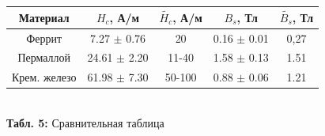 \documentclass[12pt,a4paper]{scrartcl}
\begin{document}
\begin{center}
	\begin{tabular}{|c|c|c|c|c|}
		\hline
		Материал     & $H_c$, А/м & $\tilde{H_c}$, А/м  & $B_s$, Тл & $\tilde{B_s}$, Тл \\ \hline
		Феррит       & 7.27 $\pm$ 0.76     & 20      & 0.16 $\pm$ 0.01    & 0,27               \\ \hline
		Пермаллой    & 24.61 $\pm$ 2.20      & 11-40    & 1.58 $\pm$ 0.13  & 1.51               \\ \hline
		Крем. железо & 61.98 $\pm$ 7.30      & 50-100     & 0.88  $\pm$ 0.06    & 1.21               \\ \hline
	\end{tabular}
	\\\textbf{Табл. 5:} Сравнительная таблица
\end{center}
\end{document}
